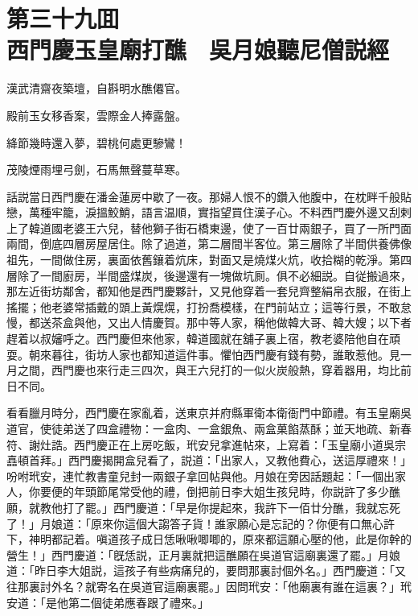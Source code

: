 
\chapter*{第三十九囬　\\西門慶玉皇廟打醮　吳月娘聽尼僧説經}


\begin{myquote}
漢武清齋夜築壇，自斟明水醮僊官。

殿前玉女移香案，雲際金人捧露盤。

絳節幾時還入夢，碧桃何處更驂鸞！

茂陵煙雨埋弓劍，石馬無聲蔓草寒。
\end{myquote}

話説當日西門慶在潘金蓮房中歇了一夜。那婦人恨不的鑽入他腹中，在枕畔千般貼戀，萬種牢籠，淚搵鮫鮹，語言温順，實指望買住漢子心。不料西門慶外邊又刮剌上了韓道國老婆王六兒，替他獅子街石橋東邊，使了一百廿兩銀子，買了一所門面兩間，倒底四層房屋居住。除了過道，第二層間半客位。第三層除了半間供養佛像祖先，一間做住房，裏面依舊鑲着炕床，對面又是燒煤火炕，收拾糊的乾淨。第四層除了一間廚房，半間盛煤炭，後邊還有一塊做坑厠。俱不必細説。自従搬過來，那左近街坊鄰舍，都知他是西門慶夥計，又見他穿着一套兒齊整絹帛衣服，在街上搖擺；他老婆常插戴的頭上黃熀熀，打扮喬模樣，在門前站立；這等行景，不敢怠慢，都送茶盒與他，又出人情慶賀。那中等人家，稱他做韓大哥、韓大嫂；以下者趕着以叔嬸呼之。西門慶但來他家，韓道國就在舖子裏上宿，教老婆陪他自在頑耍。朝來暮往，街坊人家也都知道這件事。懼怕西門慶有錢有勢，誰敢惹他。見一月之間，西門慶也來行走三四次，與王六兒打的一似火炭般熱，穿着器用，均比前日不同。

看看臘月時分，西門慶在家亂着，送東京并府縣軍衛本衛衙門中節禮。有玉皇廟吳道官，使徒弟送了四盒禮物：一盒肉、一盒銀魚、兩盒菓餡蒸酥；並天地疏、新春符、謝灶誥。西門慶正在上房吃飯，玳安兒拿進帖來，上寫着：「玉皇廟小道吳宗嚞頓首拜。」西門慶揭開盒兒看了，説道：「出家人，又教他費心，送這厚禮來！」吩咐玳安，連忙教書童兒封一兩銀子拿回帖與他。月娘在旁因話題起：「一個出家人，你要便的年頭節尾常受他的禮，倒把前日李大姐生孩兒時，你説許了多少醮願，就教他打了罷。」西門慶道：「早是你提起來，我許下一佰廿分醮，我就忘死了！」月娘道：「原來你這個大謅答子貨！誰家願心是忘記的？你便有口無心許下，神明都記着。嗔道孩子成日恁啾啾唧唧的，原來都這願心壓的他，此是你幹的營生！」西門慶道：「旣恁説，正月裏就把這醮願在吳道官這廟裏還了罷。」月娘道：「昨日李大姐説，這孩子有些病痛兒的，要問那裏討個外名。」西門慶道：「又往那裏討外名？就寄名在吳道官這廟裏罷。」因問玳安：「他廟裏有誰在這裏？」玳安道：「是他第二個徒弟應春跟了禮來。」

